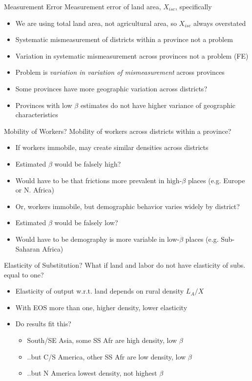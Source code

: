 \documentclass[10pt, xcolor=dvipsnames]{beamer}
\begin{document}
\begin{frame}{Measurement Error}
Measurement error of land area, $X_{isc}$, specifically
\begin{itemize}
  \item We are using total land area, not agricultural area, so $X_{isc}$ always overstated
  \item Systematic mismeasurement of districts within a province not a problem
  \item Variation in systematic mismeasurement across provinces not a problem (FE)
  \item Problem is \textit{variation in variation of mismeasurement} across provinces
  \item Some provinces have more geographic variation across districts?
  \item Provinces with low $\beta$ estimates do not have higher variance of geographic characteristics
\end{itemize}
\end{frame}

\begin{frame}{Mobility of Workers?}
Mobility of workers across districts within a province?
\begin{itemize}
  \item<1-> If workers immobile, may create similar densities across districts
  \item<1-> Estimated $\beta$ would be falsely high?
  \item<1-> Would have to be that frictions more prevalent in high-$\beta$ places (e.g. Europe or N. Africa)
  \item<2-> Or, workers immobile, but demographic behavior varies widely by district?
  \item<2-> Estimated $\beta$ would be falsely low? 
  \item<2-> Would have to be demography is more variable in low-$\beta$ places (e.g. Sub-Saharan Africa)
\end{itemize}
\end{frame}

\begin{frame}{Elasticity of Substitution?}\label{eos}
What if land and labor do not have elasticity of subs. equal to one?
\begin{itemize}
  \item Elasticity of output w.r.t. land depends on rural density $L_A/X$
  \item With EOS more than one, higher density, lower elasticity
  \item Do results fit this?
  \begin{itemize}
    \item South/SE Asia, some SS Afr are high density, low $\beta$
    \item ..but C/S America, other SS Afr are low density, low $\beta$
    \item ..but N America lowest density, not highest $\beta$
  \end{itemize}
\end{itemize}
\hfill \hyperlink{rurdbeta}{}
\end{frame}
\end{document}
